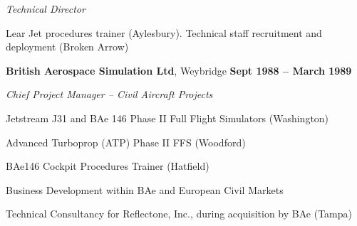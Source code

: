 \documentclass[10pt]{article}
\newenvironment{outerlist}[1][\enskip\textbullet]%
        {\begin{itemize}[#1]}{\end{itemize}%
         \vspace{-.6\baselineskip}}
\newenvironment{innerlist}[1][\enskip\textbullet]%
        {\begin{compactitem}[#1]}{\end{compactitem}}
\newcommand{\blankline}{\quad\pagebreak[2]}
\begin{document}
\begin{innerlist}
\item[] \textit{Technical Director}
	\begin{innerlist}
	\item Lear Jet procedures trainer (Aylesbury). Technical staff recruitment and deployment (Broken Arrow)
	\end{innerlist}
\end{innerlist}


\blankline

\textbf{British Aerospace Simulation Ltd}, Weybridge        \hfill \textbf{Sept 1988 -- March 1989}

\begin{innerlist}

\item[] \textit{Chief Project Manager -- Civil Aircraft Projects}%
\begin{innerlist}
\item Jetstream J31 and BAe 146 Phase II Full Flight Simulators (Washington)
\item Advanced Turboprop (ATP) Phase II FFS (Woodford)
\item BAe146 Cockpit Procedures Trainer (Hatfield)
\item Business Development within BAe and European Civil Markets
\item Technical Consultancy for Reflectone, Inc., during acquisition by BAe (Tampa)

\end{innerlist}

\end{innerlist}

\blankline

%
%
%
%
%
%
%
\end{document}
